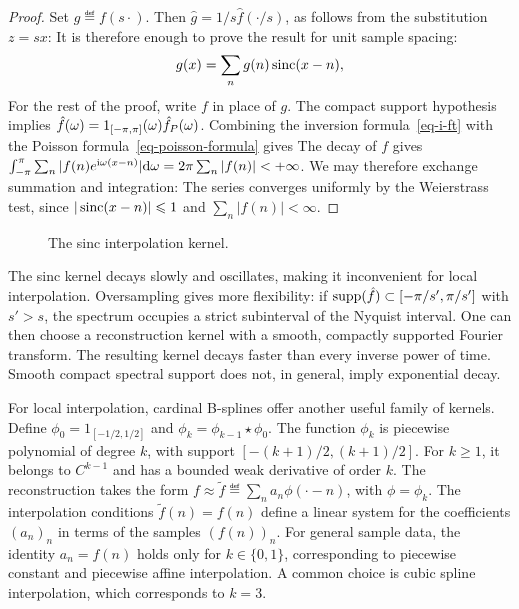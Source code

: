 \begin{proof} 
	Set $g \eqdef f(s \cdot)$. Then $\hat g=1/s \hat f(\cdot/s)$, as follows from the substitution $z=s x$:
	It is therefore enough to prove the result for unit sample spacing:
	$$
		g(x) = \sum_n g(n) \operatorname{sinc}(x-n), 
	$$
	For the rest of the proof, write $f$ in place of $g$.
	The compact support hypothesis implies $\hat f(\omega) = 1_{[-\pi,\pi]}(\omega) \hat f_P(\omega)$.  
	Combining the inversion formula~\eqref{eq-i-ft} with the Poisson formula~\eqref{eq-poisson-formula} gives
	The decay of $f$ gives $\int_{-\pi}^\pi \sum_n |f(n) e^{\mathrm{i} \omega (x-n)}| \mathrm{d} \omega = 2\pi\sum_n |f(n)| < +\infty$. We may therefore exchange summation and integration:
The series converges uniformly by the Weierstrass test, since $|\operatorname{sinc}(x-n)|\leqslant 1$ and $\sum_n|f(n)|<\infty$.
\end{proof}

\begin{figure}[tbp]
\centering
{}
\caption{The sinc interpolation kernel.}
\label{fig-review-shannon-sinc}
\end{figure}
The sinc kernel decays slowly and oscillates, making it inconvenient for local interpolation. Oversampling gives more flexibility: if $\operatorname{supp}(\hat f)\subset[-\pi/s',\pi/s']$ with $s'>s$, the spectrum occupies a strict subinterval of the Nyquist interval. One can then choose a reconstruction kernel with a smooth, compactly supported Fourier transform. The resulting kernel decays faster than every inverse power of time. Smooth compact spectral support does not, in general, imply exponential decay.

%
For local interpolation, cardinal B-splines offer another useful family of kernels. Define $\phi_0=1_{[-1/2,1/2]}$ and $\phi_k = \phi_{k-1} \star \phi_0$. The function $\phi_k$ is piecewise polynomial of degree $k$, with support $[-(k+1)/2,(k+1)/2]$. For $k\geq1$, it belongs to $C^{k-1}$ and has a bounded weak derivative of order $k$.
The reconstruction takes the form $f \approx \tilde f \eqdef \sum_n a_n \phi(\cdot-n)$, with $\phi=\phi_k$. The interpolation conditions $\tilde f(n)=f(n)$ define a linear system for the coefficients $(a_n)_n$ in terms of the samples $(f(n))_n$. For general sample data, the identity $a_n=f(n)$ holds only for $k \in \{0,1\}$, corresponding to piecewise constant and piecewise affine interpolation.
%
A common choice is cubic spline interpolation, which corresponds to $k=3$.

